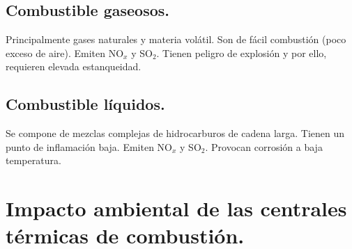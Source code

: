 \subsection{Combustible gaseosos.}
Principalmente gases naturales y materia volátil. Son de fácil combustión (poco exceso de aire). Emiten NO$_x$ y SO$_2$. Tienen peligro de explosión y por ello, requieren elevada estanqueidad.
\subsection{Combustible líquidos.}
Se compone de mezclas complejas de hidrocarburos de cadena larga. Tienen un punto de inflamación baja. Emiten NO$_x$ y SO$_2$. Provocan corrosión a baja temperatura.

\section{Impacto ambiental de las centrales térmicas de combustión.}
